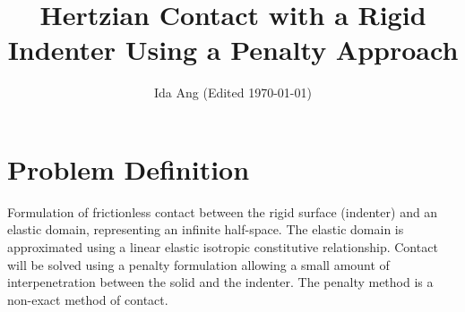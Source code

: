 \documentclass[12pt,3p]{article}
\begin{document}
\title{\Large{Hertzian Contact with a Rigid Indenter Using a Penalty Approach} \vspace{-2ex}}
\author{Ida Ang (Edited \today)}
\date{\vspace{-5ex}}
\maketitle

\tableofcontents
\newpage

\section{Problem Definition}
\vspace{-2ex}
Formulation of frictionless contact between the rigid surface (indenter) and an elastic domain, representing an infinite half-space. The elastic domain is approximated using a linear elastic isotropic constitutive relationship. Contact will be solved using a penalty formulation allowing a small amount of interpenetration between the solid and the indenter. The penalty method is a non-exact method of contact. 
\end{document}
